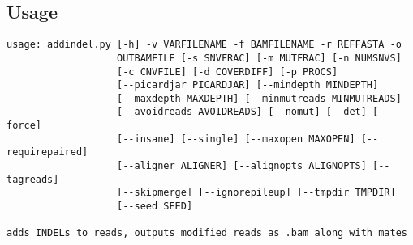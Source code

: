 \documentclass[letterpaper,11pt]{article}
\begin{document}
\subsection{Usage}
\begin{verbatim}
usage: addindel.py [-h] -v VARFILENAME -f BAMFILENAME -r REFFASTA -o
                   OUTBAMFILE [-s SNVFRAC] [-m MUTFRAC] [-n NUMSNVS]
                   [-c CNVFILE] [-d COVERDIFF] [-p PROCS]
                   [--picardjar PICARDJAR] [--mindepth MINDEPTH]
                   [--maxdepth MAXDEPTH] [--minmutreads MINMUTREADS]
                   [--avoidreads AVOIDREADS] [--nomut] [--det] [--force]
                   [--insane] [--single] [--maxopen MAXOPEN] [--requirepaired]
                   [--aligner ALIGNER] [--alignopts ALIGNOPTS] [--tagreads]
                   [--skipmerge] [--ignorepileup] [--tmpdir TMPDIR]
                   [--seed SEED]

adds INDELs to reads, outputs modified reads as .bam along with mates


\end{verbatim}
\end{document}
